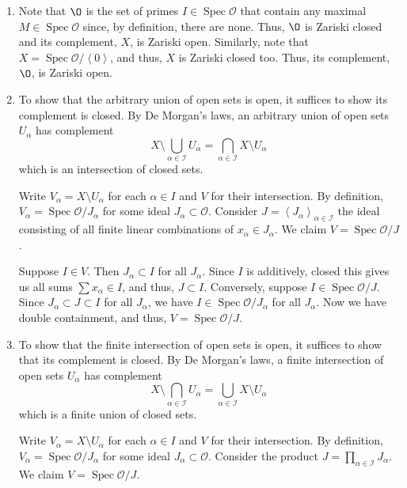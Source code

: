 \documentclass[12 pt, letterpaper]{hmcpset}
\begin{document}
\begin{solution}
	\begin{enumerate}
		\item Note that $\O$ is the set of primes $I \in \operatorname{Spec} \mathcal{O}$ that contain any maximal $M \in \operatorname{Spec} \mathcal{O}$ since, by definition, there are none. Thus, $\O$ is Zariski closed and its complement, $X$, is Zariski open.
			Similarly, note that $X = \operatorname{Spec} \mathcal{O} / \left < 0 \right >$, and thus, $X$ is Zariski closed too. Thus, its complement, $\O$, is Zariski open.
		\item To show that the arbitrary union of open sets is open, it suffices to show its complement is closed. By De Morgan's laws, an arbitrary union of open sets $U_{\alpha}$ has complement
			\[
			X \setminus \bigcup_{\alpha \in \mathcal{I}} U_{\alpha} = \bigcap_{\alpha \in \mathcal{I}} X \setminus U_{\alpha}
			\]
			which is an intersection of closed sets.

			Write $V_{\alpha} = X \setminus U_{\alpha}$ for each $\alpha \in I$ and $V$ for their intersection. By definition, $V_{\alpha} = \operatorname{Spec} \mathcal{O} / J_{\alpha}$ for some ideal $J_{\alpha} \subset \mathcal{O}$. Consider $J = \left < J_{\alpha} \right >_{\alpha \in \mathcal{I}}$ the ideal consisting of all finite linear combinations of $x_{\alpha} \in J_{\alpha}$. We claim $V = \operatorname{Spec} \mathcal{O} / J$.

			Suppose $I \in V$. Then $J_{\alpha} \subset I$ for all $J_{\alpha}$. Since $I$ is additively, closed this gives us all sums $\sum x_{\alpha} \in I$, and thus, $J \subset I$. Conversely, suppose $I \in \operatorname{Spec} \mathcal{O} / J$. Since $J_{\alpha} \subset J \subset I$ for all $J_{\alpha}$, we have $I \in \operatorname{Spec} \mathcal{O} / J_{\alpha}$ for all $J_{\alpha}$. Now we have double containment, and thus, $V = \operatorname{Spec} \mathcal{O} / J$.
		\item To show that the finite intersection of open sets is open, it suffices to show that its complement is closed. By De Morgan's laws, a finite intersection of open sets $U_{\alpha}$ has complement
			\[
				X \setminus \bigcap_{\alpha \in \mathcal{I}} U_{\alpha} = \bigcup_{\alpha \in \mathcal{I}} X \setminus U_{\alpha}
			\]
			which is a finite union of closed sets.

			Write $V_{\alpha} = X \setminus U_{\alpha}$ for each $\alpha \in I$ and $V$ for their intersection. By definition, $V_{\alpha} = \operatorname{Spec} \mathcal{O} / J_{\alpha}$ for some ideal $J_{\alpha} \subset \mathcal{O}$. Consider the product $J = \prod_{\alpha \in \mathcal{I}} J_{\alpha}$. We claim $V = \operatorname{Spec} \mathcal{O} / J$.


\end{enumerate}
\end{solution}
\end{document}
